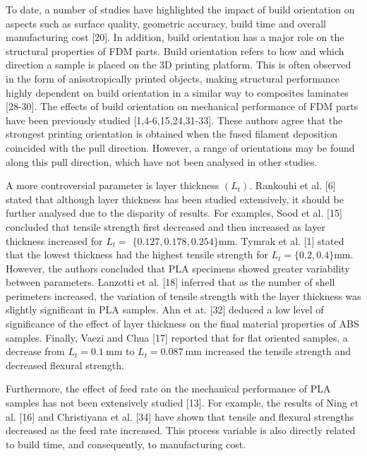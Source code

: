 \documentclass[10pt]{article}
\begin{document}
To date, a number of studies have highlighted the impact of build orientation on aspects such as surface quality, geometric accuracy, build time and overall manufacturing cost [20]. In addition, build orientation has a major role on the structural properties of FDM parts. Build orientation refers to how and which direction a sample is placed on the 3D printing platform. This is often observed in the form of anisotropically printed objects, making structural performance highly dependent on build orientation in a similar way to composites laminates [28-30]. The effects of build orientation on mechanical performance of FDM parts have been previously studied [1,4-6,15,24,31-33]. These authors agree that the strongest printing orientation is obtained when the fused filament deposition coincided with the pull direction. However, a range of orientations may be found along this pull direction, which have not been analysed in other studies.

A more controversial parameter is layer thickness $\left(L_{t}\right)$. Rankouhi et al. [6] stated that although layer thickness has been studied extensively, it should be further analysed due to the disparity of results. For examples, Sood et al. [15] concluded that tensile strength first decreased and then increased as layer thickness increased for $L_{t}=$ $\{0.127,0.178,0.254\} \mathrm{mm}$. Tymrak et al. [1] stated that the lowest thickness had the highest tensile strength for $L_{t}=\{0.2,0.4\} \mathrm{mm}$. However, the authors concluded that PLA specimens showed greater variability between parameters. Lanzotti et al. [18] inferred that as the number of shell perimeters increased, the variation of tensile strength with the layer thickness was slightly significant in PLA samples. Ahn et at. [32] deduced a low level of significance of the effect of layer thickness on the final material properties of ABS samples. Finally, Vaezi and Chua [17] reported that for flat oriented samples, a decrease from $L_{t}=0.1 \mathrm{~mm}$ to $L_{t}=0.087 \mathrm{~mm}$ increased the tensile strength and decreased flexural strength.

Furthermore, the effect of feed rate on the mechanical performance of PLA samples has not been extensively studied [13]. For example, the results of Ning et al. [16] and Christiyana et al. [34] have shown that tensile and flexural strengths decreased as the feed rate increased. This process variable is also directly related to build time, and consequently, to manufacturing cost.
\end{document}
